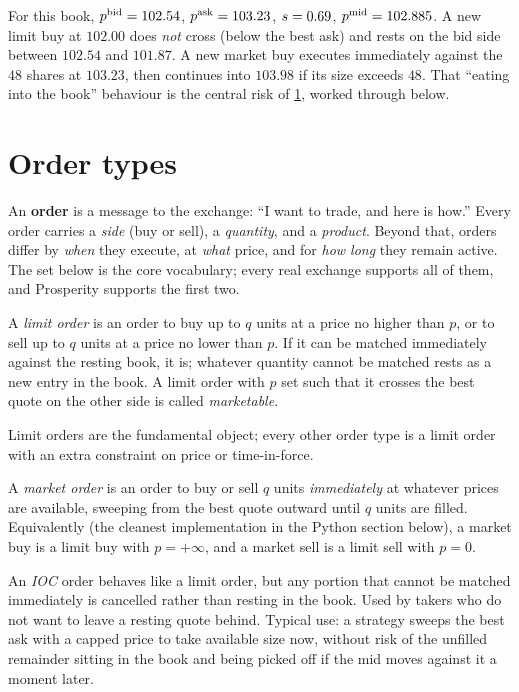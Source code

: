 For this book, $p^{\mathrm{bid}} = 102.54$, $p^{\mathrm{ask}} = 103.23$, $s = 0.69$,
$p^{\mathrm{mid}} = 102.885$. A new limit buy at $102.00$ does \emph{not} cross
(below the best ask) and rests on the bid side between $102.54$ and
$101.87$. A new market buy executes immediately against the $48$
shares at $103.23$, then continues into $103.98$ if its size exceeds
$48$. That ``eating into the book'' behaviour is the central risk of
\cref{sec:order_types}, worked through below.

\section{Order types}
\label{sec:order_types}

An \textbf{order} is a message to the exchange: ``I want to trade,
and here is how.'' Every order carries a \emph{side} (buy or sell), a
\emph{quantity}, and a \emph{product}. Beyond that, orders differ by
\emph{when} they execute, at \emph{what} price, and for \emph{how
long} they remain active. The set below is the core vocabulary; every
real exchange supports all of them, and Prosperity supports the first
two.

\begin{definition}
A \emph{limit order} is an order to buy up to $q$ units at a price no
higher than $p$, or to sell up to $q$ units at a price no lower than
$p$. If it can be matched immediately against the resting book, it
is; whatever quantity cannot be matched rests as a new entry in the
book. A limit order with $p$ set such that it crosses the best quote
on the other side is called \emph{marketable}.
\end{definition}

Limit orders are the fundamental object; every other order type is a
limit order with an extra constraint on price or time-in-force.

\begin{definition}
A \emph{market order} is an order to buy or sell $q$ units
\emph{immediately} at whatever prices are available, sweeping from the
best quote outward until $q$ units are filled. Equivalently (the
cleanest implementation in the Python section below), a market buy
is a limit buy with $p = +\infty$, and a market sell is a limit sell
with $p = 0$.
\end{definition}

\begin{definition}
An \emph{IOC} order behaves like a limit order, but any portion that
cannot be matched immediately is cancelled rather than resting in the
book. Used by takers who do not want to leave a resting quote behind.
Typical use: a strategy sweeps the best ask with a capped price to
take available size now, without risk of the unfilled remainder
sitting in the book and being picked off if the mid moves against it a
moment later.
\end{definition}

